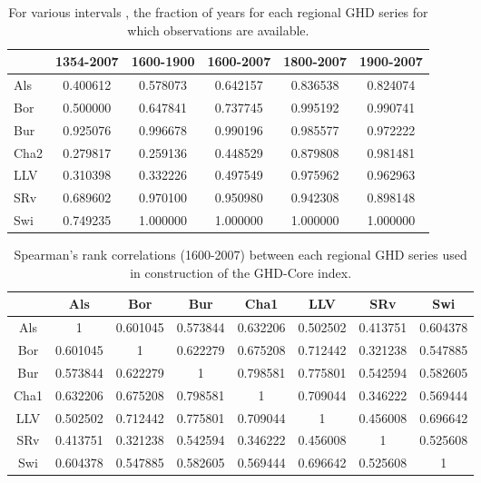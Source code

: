 \documentclass[12pt]{article}
\begin{document}
\begin{table}
\small
\caption{\small For various intervals , the fraction of years for each regional GHD series for which observations are available.}
\centering
\begin{tabular}{l c c c c c}
\hline
 & \bf 1354-2007 & \bf 1600-1900 & \bf 1600-2007 & \bf 1800-2007 & \bf 1900-2007\\
\hline
Als	& 0.400612 & 0.578073 & 0.642157 & 0.836538	 & 0.824074\\
Bor	 & 0.500000 & 0.647841 & 0.737745 & 0.995192 & 0.990741\\
Bur & 	0.925076	& 0.996678	& 0.990196	& 0.985577	& 0.972222\\
Cha2	& 0.279817	& 0.259136	& 0.448529	& 0.879808	& 0.981481\\
LLV	& 0.310398	& 0.332226	& 0.497549	& 0.975962	& 0.962963\\
SRv	& 0.689602	& 0.970100	& 0.950980	& 0.942308	& 0.898148\\
Swi 	& 0.749235	& 1.000000	& 1.000000	& 1.000000	& 1.000000\\
\hline
\end{tabular}
\end{table}

\begin{table}
\small
\caption{\small Spearman's rank correlations (1600-2007) between each regional GHD series used in construction of the GHD-Core index.}
\centering
\begin{tabular}{c c c c c c c c}
\hline
& Als & Bor & Bur & Cha1 & LLV & SRv & Swi \\
\hline
Als	& 1	& 0.601045	& 0.573844	& 0.632206	& 0.502502	& 0.413751	& 0.604378\\
Bor & 0.601045 	& 1	& 0.622279		& 0.675208	& 0.712442 	& 0.321238 	& 0.547885\\
Bur &	0.573844	& 0.622279	& 1	& 0.798581	& 0.775801	& 0.542594	& 0.582605\\
Cha1	& 0.632206	& 0.675208	& 0.798581	& 1	 & 0.709044	& 0.346222	& 0.569444\\
LLV	& 0.502502	& 0.712442	& 0.775801	& 0.709044	& 1 & 0.456008 & 0.696642\\
SRv	& 0.413751	& 0.321238	& 0.542594	& 0.346222	& 0.456008	& 1	 & 0.525608\\
Swi	 & 0.604378	& 0.547885	& 0.582605	& 0.569444	& 0.696642	& 0.525608	& 1\\
\hline
\end{tabular}
\end{table}
\end{document}
